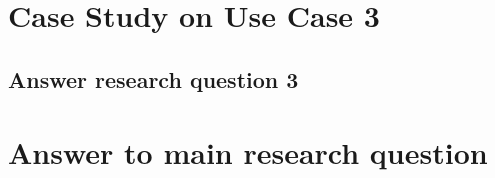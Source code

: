 \section{Case Study on Use Case 3}%

\subsection*{Answer research question 3}

\section{Answer to main research question}







